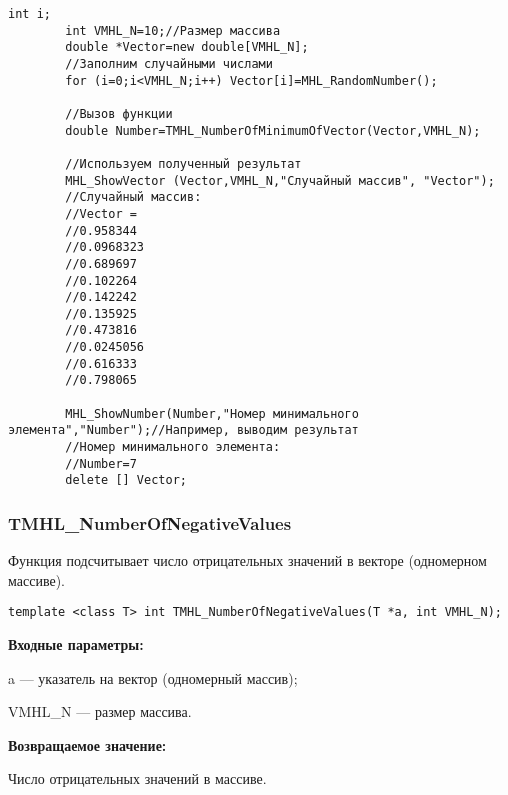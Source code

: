 \documentclass[a4paper,12pt]{article}
\begin{document}
\begin{lstlisting}[label=code_use_TMHL_NumberOfMinimumOfVector,caption=Пример использования]
        int i;
        int VMHL_N=10;//Размер массива
        double *Vector=new double[VMHL_N];
        //Заполним случайными числами
        for (i=0;i<VMHL_N;i++) Vector[i]=MHL_RandomNumber();

        //Вызов функции
        double Number=TMHL_NumberOfMinimumOfVector(Vector,VMHL_N);

        //Используем полученный результат
        MHL_ShowVector (Vector,VMHL_N,"Случайный массив", "Vector");
        //Случайный массив:
        //Vector =
        //0.958344
        //0.0968323
        //0.689697
        //0.102264
        //0.142242
        //0.135925
        //0.473816
        //0.0245056
        //0.616333
        //0.798065

        MHL_ShowNumber(Number,"Номер минимального элемента","Number");//Например, выводим результат
        //Номер минимального элемента:
        //Number=7
        delete [] Vector;
\end{lstlisting}

\subsubsection{TMHL\_NumberOfNegativeValues}\label{TMHL_NumberOfNegativeValues}

Функция подсчитывает число отрицательных значений в векторе (одномерном массиве).


\begin{lstlisting}[label=code_syntax_TMHL_NumberOfNegativeValues,caption=Синтаксис]
template <class T> int TMHL_NumberOfNegativeValues(T *a, int VMHL_N);
\end{lstlisting}

\textbf{Входные параметры:}

 a --- указатель на вектор (одномерный массив);
 
 VMHL\_N --- размер массива.

\textbf{Возвращаемое значение:}

 Число отрицательных значений в массиве.
\end{document}
